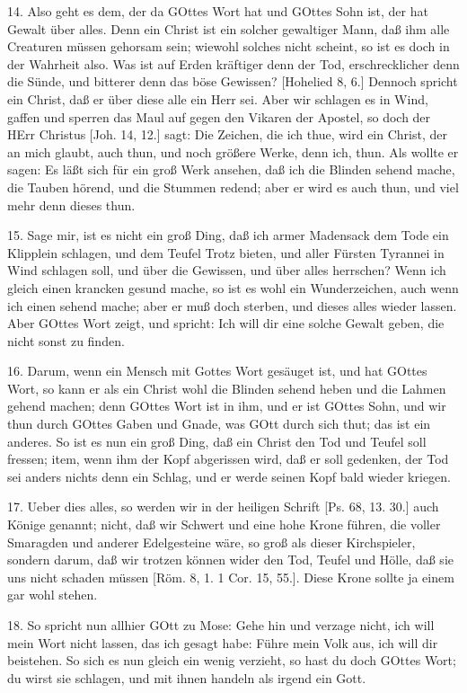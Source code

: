 14. Also geht es dem, der da GOttes Wort hat und GOttes Sohn ist, der hat Gewalt über alles. Denn ein Christ ist ein solcher gewaltiger Mann, daß ihm alle Creaturen müssen gehorsam sein; wiewohl solches nicht scheint, so ist es doch in der Wahrheit also. Was ist auf Erden kräftiger denn der Tod, erschrecklicher denn die Sünde, und bitterer denn das böse Gewissen? [Hohelied 8, 6.] Dennoch spricht ein Christ, daß er über diese alle ein Herr sei. Aber wir schlagen es in Wind, gaffen und sperren das Maul auf gegen den Vikaren der Apostel, so doch der HErr Christus [Joh. 14, 12.] sagt: Die Zeichen, die ich thue, wird ein Christ, der an mich glaubt, auch thun, und noch größere Werke, denn ich, thun. Als wollte er sagen: Es läßt sich für ein groß Werk ansehen, daß ich die Blinden sehend mache, die Tauben hörend, und die Stummen redend; aber er wird es auch thun, und viel mehr denn dieses thun.

15. Sage mir, ist es nicht ein groß Ding, daß ich armer Madensack dem Tode ein Klipplein schlagen, und dem Teufel Trotz bieten, und aller Fürsten Tyrannei in Wind schlagen soll, und über die Gewissen, und über alles herrschen? Wenn ich gleich einen krancken gesund mache, so ist es wohl ein Wunderzeichen, auch wenn ich einen sehend mache; aber er muß doch sterben, und dieses alles wieder lassen. Aber GOttes
Wort zeigt, und spricht: Ich will dir eine solche Gewalt geben, die nicht sonst zu finden.

16. Darum, wenn ein Mensch mit Gottes Wort gesäuget ist, und hat GOttes Wort, so kann er als ein Christ wohl die Blinden sehend heben und die Lahmen gehend machen; denn GOttes Wort ist in ihm, und er ist GOttes Sohn, und wir thun durch GOttes Gaben und Gnade, was GOtt durch sich thut; das ist ein anderes. So ist es nun ein groß Ding, daß ein Christ den Tod und Teufel soll fressen; item, wenn ihm der Kopf abgerissen wird, daß er soll gedenken, der Tod sei anders nichts denn ein Schlag, und er werde seinen Kopf bald wieder kriegen.

17. Ueber dies alles, so werden wir in der heiligen Schrift [Ps. 68, 13. 30.] auch Könige genannt; nicht, daß wir Schwert und eine hohe Krone führen, die voller Smaragden und anderer Edelgesteine wäre, so groß als dieser Kirchspieler, sondern darum, daß wir trotzen können wider den Tod, Teufel und Hölle, daß sie uns nicht schaden müssen [Röm. 8, 1. 1 Cor. 15, 55.]. Diese Krone sollte ja einem gar wohl stehen.

18. So spricht nun allhier GOtt zu Mose: Gehe hin und verzage nicht, ich will mein Wort nicht lassen, das ich gesagt habe: Führe mein Volk aus, ich will dir beistehen. So sich es nun gleich ein wenig verzieht, so hast du doch GOttes Wort; du wirst sie schlagen, und mit ihnen handeln als irgend ein Gott.

